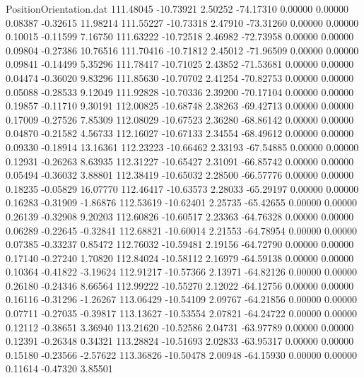 \begin{filecontents}{PositionOrientation.dat}
 111.48045  -10.73921    2.50252   -74.17310    0.00000    0.00000    0.08387   -0.32615   11.98214
 111.55227  -10.73318    2.47910   -73.31260    0.00000    0.00000    0.10015   -0.11599    7.16750
 111.63222  -10.72518    2.46982   -72.73958    0.00000    0.00000    0.09804   -0.27386   10.76516
 111.70416  -10.71812    2.45012   -71.96509    0.00000    0.00000    0.09841   -0.14499    5.35296
 111.78417  -10.71025    2.43852   -71.53681    0.00000    0.00000    0.04474   -0.36020    9.83296
 111.85630  -10.70702    2.41254   -70.82753    0.00000    0.00000    0.05088   -0.28533    9.12049
 111.92828  -10.70336    2.39200   -70.17104    0.00000    0.00000    0.19857   -0.11710    9.30191
 112.00825  -10.68748    2.38263   -69.42713    0.00000    0.00000    0.17009   -0.27526    7.85309
 112.08029  -10.67523    2.36280   -68.86142    0.00000    0.00000    0.04870   -0.21582    4.56733
 112.16027  -10.67133    2.34554   -68.49612    0.00000    0.00000    0.09330   -0.18914   13.16361
 112.23223  -10.66462    2.33193   -67.54885    0.00000    0.00000    0.12931   -0.26263    8.63935
 112.31227  -10.65427    2.31091   -66.85742    0.00000    0.00000    0.05494   -0.36032    3.88801
 112.38419  -10.65032    2.28500   -66.57776    0.00000    0.00000    0.18235   -0.05829   16.07770
 112.46417  -10.63573    2.28033   -65.29197    0.00000    0.00000    0.16283   -0.31909   -1.86876
 112.53619  -10.62401    2.25735   -65.42655    0.00000    0.00000    0.26139   -0.32908    9.20203
 112.60826  -10.60517    2.23363   -64.76328    0.00000    0.00000    0.06289   -0.22645   -0.32841
 112.68821  -10.60014    2.21553   -64.78954    0.00000    0.00000    0.07385   -0.33237    0.85472
 112.76032  -10.59481    2.19156   -64.72790    0.00000    0.00000    0.17140   -0.27240    1.70820
 112.84024  -10.58112    2.16979   -64.59138    0.00000    0.00000    0.10364   -0.41822   -3.19624
 112.91217  -10.57366    2.13971   -64.82126    0.00000    0.00000    0.26180   -0.24346    8.66564
 112.99222  -10.55270    2.12022   -64.12756    0.00000    0.00000    0.16116   -0.31296   -1.26267
 113.06429  -10.54109    2.09767   -64.21856    0.00000    0.00000    0.07711   -0.27035   -0.39817
 113.13627  -10.53554    2.07821   -64.24722    0.00000    0.00000    0.12112   -0.38651    3.36940
 113.21620  -10.52586    2.04731   -63.97789    0.00000    0.00000    0.12391   -0.26348    0.34321
 113.28824  -10.51693    2.02833   -63.95317    0.00000    0.00000    0.15180   -0.23566   -2.57622
 113.36826  -10.50478    2.00948   -64.15930    0.00000    0.00000    0.11614   -0.47320    3.85501

\end{filecontents}
